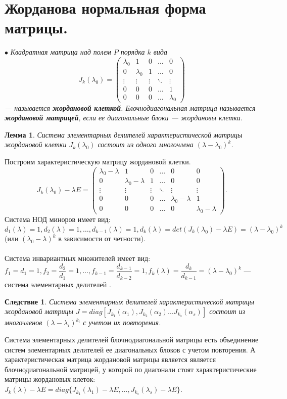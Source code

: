 \section{Жорданова нормальная форма матрицы.}
$\bullet$ \textit{Квадратная матрица над полем $P$ порядка $k$ вида}
$$J_k(\lambda_0) = \begin{pmatrix}
	\lambda_0 & 1 & 0 & \dots & 0 \\
	0 & \lambda_0 & 1 & \dots & 0 \\
	\vdots & \vdots & \vdots & \ddots & \vdots\\
	0 & 0 & 0 & \dots & 1 \\
	0 & 0 & 0 & \dots & \lambda_0 \end{pmatrix} 
$$ \textit{--- называется \textbf{жордановой клеткой}. Блочнодиагональная матрица называется \textbf{жордановой матрицей}, если ее диагональные блоки --- жордановы клетки.}
\newtheorem*{lem12_8_1}{Лемма}\begin{lem12_8_1} Система элементарных делителей характеристической матрицы жордановой клетки $J_k(\lambda_0)$ состоит из одного многочлена $(\lambda - \lambda_0) ^ k$.
\end{lem12_8_1}\begin{Proof}Построим характеристическую матрицу жордановой клетки.
	$$J_k(\lambda_0) - \lambda E = \begin{pmatrix} \lambda_0 - \lambda & 1 & 0 & \dots & 0 & 0 \\ 
		0 & \lambda_0 - \lambda & 1 & \dots & 0 & 0 \\ 
		\vdots & \vdots & \vdots & \ddots & \vdots & \vdots\\ 0 & 0 & 0 & \dots & \lambda_0 - \lambda & 1 \\ 0 & 0 & 0 & \dots & 0 & \lambda_0 - \lambda \end{pmatrix}.$$
	Система НОД миноров имеет вид: $d_1(\lambda) = 1, d_2(\lambda) = 1,\dots, d_{k-1}(\lambda) = 1, d_k(\lambda) =det(J_k(\lambda_0) - \lambda E)= (\lambda - \lambda_0)^k$ (или $(\lambda_0 - \lambda)^k$ в зависимости от четности).\\\\
	Система инвариантных множителей имеет вид: $f_1 = d_1 = 1, f_2 = \dfrac{d_2}{d_1} = 1,\dots, f_{k-1}=\dfrac{d_{k-1}}{d_{k-2}} = 1, f_k(\lambda) = \dfrac{d_{k}}{d_{k-1}} = (\lambda - \lambda_0)^k$ --- система элементарных делителей	.
\end{Proof}
\newtheorem*{cor12_8_2}{Следствие}\begin{cor12_8_2}Система элементарных делителей характеристической матрицы жордановой матрицы $J = diag[J_{k_1}(\alpha_1), J_{k_2}(\alpha_2) \dots J_{k_s}(\alpha_s)]$ состоит из многочленов $(\lambda - \lambda_i)^{k_i}$ с учетом их повторения.
\end{cor12_8_2}\begin{Proof}
	Система элементарных делителей блочнодиагональной матрицы есть объединение систем элементарных делителей ее диагональных блоков с учетом повторения. А характеристическая матрица жордановой матрицы является является блочнодиагональной матрицей, у которой по диагонали стоят характеристические матрицы жордановых клеток: $J_k(\lambda) - \lambda E = diag\{J_{k_1}(\lambda_1)-\lambda E,\dots,J_{k_s}(\lambda_s)-\lambda E \}$.
\end{Proof}
